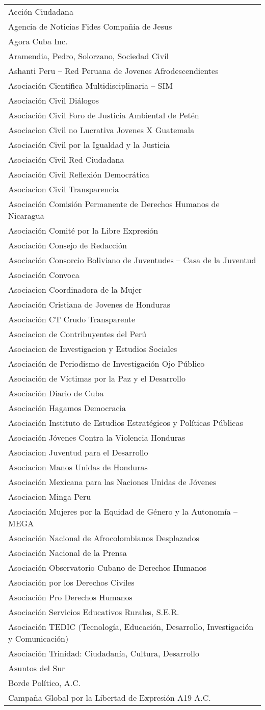 \begin{longtable}[]{@{}l@{}}
\toprule
\endhead
Acción Ciudadana\tabularnewline
Agencia de Noticias Fides Compañia de Jesus\tabularnewline
Agora Cuba Inc.\tabularnewline
Aramendia, Pedro, Solorzano, Sociedad Civil\tabularnewline
Ashanti Peru -- Red Peruana de Jovenes Afrodescendientes\tabularnewline
Asociación Científica Multidisciplinaria -- SIM\tabularnewline
Asociación Civil Diálogos\tabularnewline
Asociación Civil Foro de Justicia Ambiental de Petén\tabularnewline
Asociacion Civil no Lucrativa Jovenes X Guatemala\tabularnewline
Asociación Civil por la Igualdad y la Justicia\tabularnewline
Asociación Civil Red Ciudadana\tabularnewline
Asociación Civil Reflexión Democrática\tabularnewline
Asociacion Civil Transparencia\tabularnewline
Asociación Comisión Permanente de Derechos Humanos de
Nicaragua\tabularnewline
Asociación Comité por la Libre Expresión\tabularnewline
Asociación Consejo de Redacción\tabularnewline
Asociación Consorcio Boliviano de Juventudes -- Casa de la
Juventud\tabularnewline
Asociación Convoca\tabularnewline
Asociacion Coordinadora de la Mujer\tabularnewline
Asociación Cristiana de Jovenes de Honduras\tabularnewline
Asociación CT Crudo Transparente\tabularnewline
Asociacion de Contribuyentes del Perú\tabularnewline
Asociacion de Investigacion y Estudios Sociales\tabularnewline
Asociación de Periodismo de Investigación Ojo Público\tabularnewline
Asociación de Víctimas por la Paz y el Desarrollo\tabularnewline
Asociación Diario de Cuba\tabularnewline
Asociación Hagamos Democracia\tabularnewline
Asociación Instituto de Estudios Estratégicos y Políticas
Públicas\tabularnewline
Asociación Jóvenes Contra la Violencia Honduras\tabularnewline
Asociacion Juventud para el Desarrollo\tabularnewline
Asociacion Manos Unidas de Honduras\tabularnewline
Asociación Mexicana para las Naciones Unidas de Jóvenes\tabularnewline
Asociacion Minga Peru\tabularnewline
Asociación Mujeres por la Equidad de Género y la Autonomía --
MEGA\tabularnewline
Asociación Nacional de Afrocolombianos Desplazados\tabularnewline
Asociación Nacional de la Prensa\tabularnewline
Asociación Observatorio Cubano de Derechos Humanos\tabularnewline
Asociación por los Derechos Civiles\tabularnewline
Asociación Pro Derechos Humanos\tabularnewline
Asociación Servicios Educativos Rurales, S.E.R.\tabularnewline
Asociación TEDIC (Tecnología, Educación, Desarrollo, Investigación y
Comunicación)\tabularnewline
Asociación Trinidad: Ciudadanía, Cultura, Desarrollo\tabularnewline
Asuntos del Sur\tabularnewline
Borde Político, A.C.\tabularnewline
Campaña Global por la Libertad de Expresión A19 A.C.\tabularnewline

\end{longtable}
